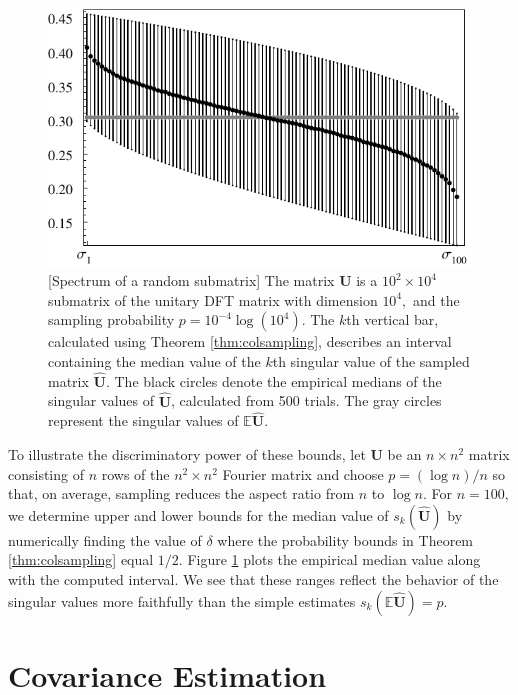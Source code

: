 \documentclass[11pt,letterpaper,twoside,reqno,nosumlimits]{amsart}
\newcommand{\mat}[1]{\ensuremath{\bm{#1}}} %
\newcommand{\E}{\ensuremath{\mathbb{E}}}
\newcommand{\s}{s} %
\theoremstyle{remark}
\numberwithin{equation}{section}
\numberwithin{thm}{section}
\numberwithin{prop}{section}
\numberwithin{defn}{section}
\numberwithin{remark}{section}
\begin{document}
\begin{figure}[t!]
\includegraphics{col_spars_nlogn_100}
\caption{[Spectrum of a random submatrix] The matrix $\mat{U}$ is a $10^2 \times 10^4$ submatrix of the unitary DFT matrix with dimension $10^4,$ and the sampling probability $p = 10^{-4} \log(10^4).$ The $k$th vertical bar, calculated using Theorem \ref{thm:colsampling}, describes an interval containing the median value of the $k$th singular value of the sampled matrix $\widehat{\mat{U}}$. The black circles denote the empirical medians of the singular values of $\widehat{\mat{U}}$, calculated from 500 trials. The gray circles represent the singular values of $\E \widehat{\mat{U}}.$}  
\label{fig:nlogn}
\end{figure}

To illustrate the discriminatory power of these bounds, let $\mat{U}$ be an $n \times n^2$ matrix consisting of $n$ rows of the $n^2 \times n^2$ Fourier matrix and choose $p = (\log n)/n$ so that, on average, sampling reduces the aspect ratio from $n$ to $\log n.$  For $n=100,$ we determine upper and lower bounds for the median value of $\s_k(\widehat{\mat{U}})$ by numerically finding the value of $\delta$ where the probability bounds in Theorem \ref{thm:colsampling} equal $1/2.$ Figure \ref{fig:nlogn} plots the empirical median value along with the computed interval. We see that these ranges reflect the behavior of the singular values more faithfully than the simple estimates $\s_k(\mathbb{E} \widehat{\mat{U}}) = p.$

\section{Covariance Estimation}
\label{sec:covarianceest}
\end{document}
